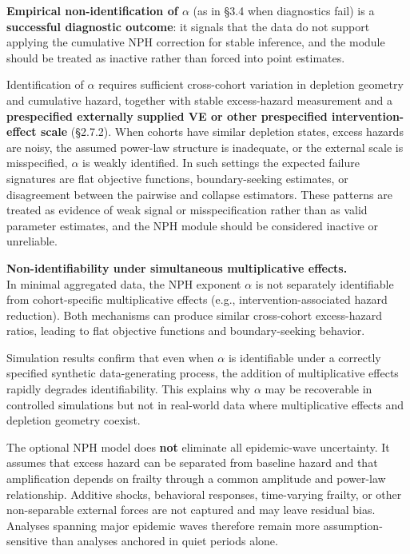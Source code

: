 \documentclass[
]{article}
\begin{document}
\textbf{Empirical non-identification of \(\alpha\)} (as in §3.4 when
diagnostics fail) is a \textbf{successful diagnostic outcome}: it
signals that the data do not support applying the cumulative NPH
correction for stable inference, and the module should be treated as
inactive rather than forced into point estimates.

Identification of \(\alpha\) requires sufficient cross-cohort variation
in depletion geometry and cumulative hazard, together with stable
excess-hazard measurement and a \textbf{prespecified externally supplied
VE or other prespecified intervention-effect scale} (§2.7.2). When
cohorts have similar depletion states, excess hazards are noisy, the
assumed power-law structure is inadequate, or the external scale is
misspecified, \(\alpha\) is weakly identified. In such settings the
expected failure signatures are flat objective functions,
boundary-seeking estimates, or disagreement between the pairwise and
collapse estimators. These patterns are treated as evidence of weak
signal or misspecification rather than as valid parameter estimates, and
the NPH module should be considered inactive or unreliable.

\textbf{Non-identifiability under simultaneous multiplicative
effects.}\\
In minimal aggregated data, the NPH exponent \(\alpha\) is not
separately identifiable from cohort-specific multiplicative effects
(e.g., intervention-associated hazard reduction). Both mechanisms can
produce similar cross-cohort excess-hazard ratios, leading to flat
objective functions and boundary-seeking behavior.

Simulation results confirm that even when \(\alpha\) is identifiable
under a correctly specified synthetic data-generating process, the
addition of multiplicative effects rapidly degrades identifiability.
This explains why \(\alpha\) may be recoverable in controlled
simulations but not in real-world data where multiplicative effects and
depletion geometry coexist.

The optional NPH model does \textbf{not} eliminate all epidemic-wave
uncertainty. It assumes that excess hazard can be separated from
baseline hazard and that amplification depends on frailty through a
common amplitude and power-law relationship. Additive shocks, behavioral
responses, time-varying frailty, or other non-separable external forces
are not captured and may leave residual bias. Analyses spanning major
epidemic waves therefore remain more assumption-sensitive than analyses
anchored in quiet periods alone.
\end{document}
